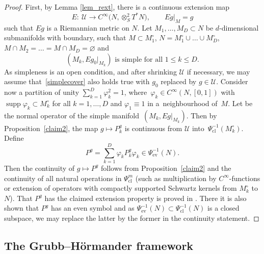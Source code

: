 \documentclass[pdftex]{sigma}
\numberwithin{equation}{section}
\theoremstyle{definition}
\newcommand{\ev}{\mathrm{ev}}
\newcommand{\1}{{\bf 1}}
\DeclareMathOperator{\supp}{supp}
\newcommand{\cl}{\mathrm{cl}}
\begin{document}
\begin{proof}
	First, by Lemma \ref{lem_rext}, there is a continuous extension map
	\[
		E\colon \ \mathcal U\rightarrow C^\infty\bigl(N,\otimes^2_S T^*N\bigr),\qquad Eg|_{M} =g
	\]	
	such that $Eg$ is a Riemannian metric on $N$. Let $M_1,\dots, M_D\subset N$ be $d$-dimensional submanifolds with boundary, such that $M\subset M_1^\circ$, $N=M_1^\circ\cup\dots\cup M_D^\circ$, $M\cap M_2=\dots= M\cap M_D=\varnothing$ and
	\begin{equation}\label{simplecover}
		(M_k,Eg_0|_{M_k}) \text{ is simple for all } 1\le k \le D.
	\end{equation}
	As simpleness is an open condition, and after shrinking $\mathcal U$ if necessary, we may assume that~\eqref{simplecover} also holds true with $g_0$ replaced by $g\in \mathcal U$. Consider now a partition of unity ${\sum_{k=1}^D\varphi_k^2 = 1}$, where~$\varphi_k\in C^\infty(N,[0,1])$ with $\supp \varphi_k \subset M_k^\circ$ for all $k=1,\dots, D$ and $\varphi_1\equiv 1$ in a~neighbourhood of~$M$. Let \smash{$
	P_k^g:=N_0^{Eg\vert_{M_k}}\in \Psi_{\cl}^{-1}(M_k^\circ)
	$}
	be the normal operator of the simple manifold~$(M_k,E g\vert_{M_k})$. Then by Proposition~\ref{claim2}, the map
$g\mapsto\! P^g_k$ is continuous from $\mathcal U$ into~$\Psi_\cl^{-1}(M_k^\circ)$.
Define
\[
P^g = \sum_{k=1}^D \varphi_k P^g_k \varphi_k \in \Psi^{-1}_\ev(N).
\]
Then the continuity of $g\mapsto P^g$ follows from Proposition~\ref{claim2} and the continuity of all natural operations in $\Psi_\cl^{m}$ (such as multiplication by $C^\infty$-functions or extension of operators with compactly supported Schwartz kernels from $M_k^\circ$ to $N$). That $P^g$ has the claimed extension property is proved in \cite[Section~4.1]{MNP19a}. There it is also shown that $P^g$ has an even symbol and as $\Psi^{-1}_\ev(N)\subset \Psi^{-1}_\cl(N)$ is a closed subspace, we may replace the latter by the former in the continuity statement.
\end{proof}



\subsection{The Grubb--H{\"o}rmander framework}\label{s_gruho}
\end{document}
